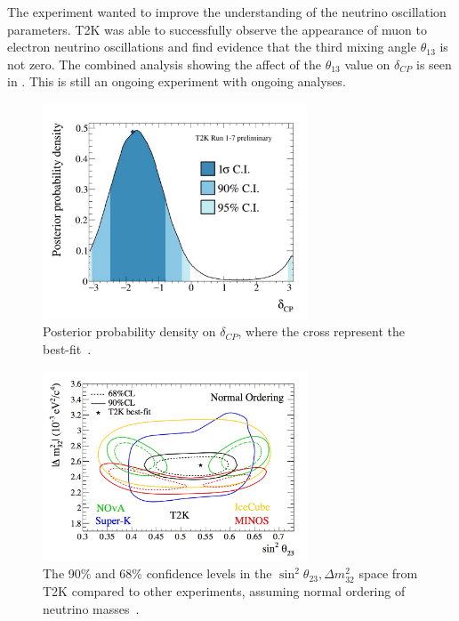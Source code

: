 The experiment wanted to improve the understanding of the neutrino oscillation parameters. T2K was able to successfully observe the appearance of muon to electron neutrino oscillations and find evidence that the third mixing angle $\theta_{13}$ is not zero. The combined analysis showing the affect of the $\theta_{13}$ value on $\delta_{CP}$ is seen in . This is still an ongoing experiment with ongoing analyses.


\begin{figure}[h!]
\centering
  \centering
\includegraphics[width=0.7\textwidth]{figures/t2k1.jpeg}
\vspace{2mm}
\caption{Posterior probability density on $\delta_{CP}$, where the cross represent the best-fit~\cite{T2Kfigures}.}
\label{fig:T2KCP}
\end{figure}

\begin{figure}[h!]
\centering
  \centering
\includegraphics[width=0.7\textwidth]{figures/t2k2.jpeg}
\vspace{2mm}
\caption{The 90\% and 68\% confidence levels in the $\sin^2 \theta_{23}, \Delta m^2_{32}$ space from T2K compared to other experiments, assuming normal ordering of neutrino masses~\cite{T2Kfigures}.}
\label{fig:T2K23}
\end{figure}

